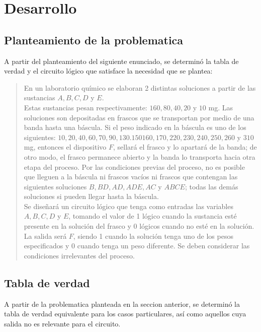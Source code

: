 \documentclass[a4paper,12pt]{article}
\begin{document}
\section{Desarrollo}

\subsection{Planteamiento de la problematica}

A partir del planteamiento del siguiente enunciado, se determinó la tabla de verdad y el
circuito lógico que satisface la necesidad que se plantea:\par

\begin{quotation}
	En un laboratorio químico se elaboran 2 distintas soluciones a partir de las sustancias $A, B, C, D$ y $E$.\\
Estas sustancias pesan respectivamente: $160, 80, 40, 20$ y $10$ mg. Las soluciones son depositadas en
frascos que se transportan por medio de una banda hasta una báscula. Si el peso indicado en la báscula es
uno de los siguientes: $10, 20, 40, 60, 70, 90, 130. 150 160, 170, 220, 230, 240, 250, 260$ y $310$ mg,
entonces el dispositivo $F$, sellará el frasco y lo apartará de la banda; de otro modo, el frasco permanece
abierto y la banda lo transporta hacia otra etapa del proceso. Por las condiciones previas del proceso, no
es posible que lleguen a la báscula ni frascos vacíos ni frascos que contengan las siguientes soluciones $B,
BD, AD, ADE, AC$ y $ABCE$; todas las demás soluciones si pueden llegar hasta la báscula.\\
Se diseñará un circuito lógico que tenga como entradas las variables $A, B, C, D$ y $E$, tomando el valor de
1 lógico cuando la sustancia esté presente en la solución del frasco y 0 lógicos cuando no esté en la
solución. La salida será $F$, siendo 1 cuando la solución tenga uno de los pesos especificados y 0 cuando
tenga un peso diferente. Se deben considerar las condiciones irrelevantes del proceso.\par
\end{quotation}

\subsection{Tabla de verdad}

A partir de la problematica planteada en la seccion anterior, se determinó la tabla de verdad equivalente para los casos particulares, así como aquellos cuya salida no es relevante para el circuito.\\
\end{document}
